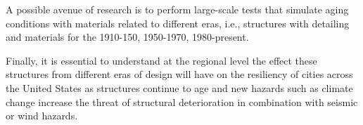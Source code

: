 A possible avenue of research is to perform large-scale tests that simulate aging conditions with materials related to different eras, i.e., structures with detailing and materials for the 1910-150, 1950-1970, 1980-present. 

Finally, it is essential to understand at the regional level the effect these structures from different eras of design will have on the resiliency of cities across the United States as structures continue to age and new hazards such as climate change increase the threat of structural deterioration in combination with seismic or wind hazards.